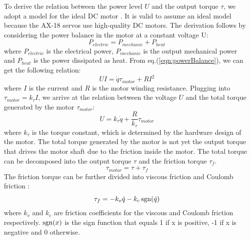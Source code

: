 To derive the relation between the power level $U$ and the output torque $\tau$, we adopt a model for the ideal DC motor \cite{SchwarzB:2013}. It is valid to assume an ideal model because the AX-18 servos use high-quality DC motors. The derivation follows by considering the power balance in the motor at a constant voltage U:
\begin{equation}
  P_{electric} = P_{mechanic} + P_{heat}
  \label{eqn:powerBalance}
\end{equation}
where $P_{electric}$ is the electrical power, $P_{mechanic}$ is the output mechanical power and $P_{heat}$ is the power dissipated as heat. From eq.(\ref{eqn:powerBalance}), we can get the following relation:
\begin{equation}
UI=\dot{q}\tau_{motor} + RI^2
\end{equation}
where $I$ is the current and $R$ is the motor winding resistance. Plugging into $\tau_{motor}=k_{\tau}I$, we arrive at the relation between the voltage $U$ and the total torque generated by the motor $\tau_{motor}$:
\begin{equation}
  U=k_{\tau}\dot{q}+\frac{R}{k_{\tau}}\tau_{motor}
  \label{eqn:votageTorqueRelation}
\end{equation}
where $k_{\tau}$ is the torque constant, which is determined by the hardware design of the motor. The total torque generated by the motor is not yet the output torque that drives the motor shaft due to the friction inside the motor. The total torque can be decomposed into the output torque $\tau$ and the friction torque $\tau_f$.
\begin{equation}
  \tau_{motor}=\tau+\tau_f
  \label{eqn:torqueBalance}
\end{equation}
The friction torque can be further divided into viscous friction and Coulomb friction \cite{SchwarzB:2013}:
\begin{equation}
  \tau_f = -k_v\dot{q}-k_c\operatorname{sgn}(\dot{q})
  \label{eqn:frictionComponents}
\end{equation}
where $k_v$ and $k_c$ are friction coefficients for the viscous and Coulomb friction respectively. $\operatorname{sgn}(x)$ is the sign function that equals 1 if x is positive, -1 if x is negative and 0 otherwise.

